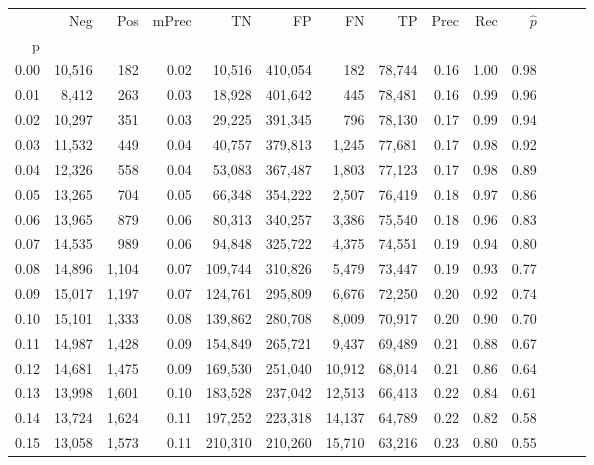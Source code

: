 \begin{tabular}{rrrrrrrrrrrrrr}
\toprule
{} &     Neg &    Pos & mPrec &       TN &       FP &      FN &      TP &  Prec &   Rec & $\hat{p}$ \\
p    &         &        &       &          &          &         &         &       &       &           \\
\midrule
0.00 &  10,516 &    182 &  0.02 &   10,516 &  410,054 &     182 &  78,744 &  0.16 &  1.00 &      0.98 \\
0.01 &   8,412 &    263 &  0.03 &   18,928 &  401,642 &     445 &  78,481 &  0.16 &  0.99 &      0.96 \\
0.02 &  10,297 &    351 &  0.03 &   29,225 &  391,345 &     796 &  78,130 &  0.17 &  0.99 &      0.94 \\
0.03 &  11,532 &    449 &  0.04 &   40,757 &  379,813 &   1,245 &  77,681 &  0.17 &  0.98 &      0.92 \\
0.04 &  12,326 &    558 &  0.04 &   53,083 &  367,487 &   1,803 &  77,123 &  0.17 &  0.98 &      0.89 \\
0.05 &  13,265 &    704 &  0.05 &   66,348 &  354,222 &   2,507 &  76,419 &  0.18 &  0.97 &      0.86 \\
0.06 &  13,965 &    879 &  0.06 &   80,313 &  340,257 &   3,386 &  75,540 &  0.18 &  0.96 &      0.83 \\
0.07 &  14,535 &    989 &  0.06 &   94,848 &  325,722 &   4,375 &  74,551 &  0.19 &  0.94 &      0.80 \\
0.08 &  14,896 &  1,104 &  0.07 &  109,744 &  310,826 &   5,479 &  73,447 &  0.19 &  0.93 &      0.77 \\
0.09 &  15,017 &  1,197 &  0.07 &  124,761 &  295,809 &   6,676 &  72,250 &  0.20 &  0.92 &      0.74 \\
0.10 &  15,101 &  1,333 &  0.08 &  139,862 &  280,708 &   8,009 &  70,917 &  0.20 &  0.90 &      0.70 \\
0.11 &  14,987 &  1,428 &  0.09 &  154,849 &  265,721 &   9,437 &  69,489 &  0.21 &  0.88 &      0.67 \\
0.12 &  14,681 &  1,475 &  0.09 &  169,530 &  251,040 &  10,912 &  68,014 &  0.21 &  0.86 &      0.64 \\
0.13 &  13,998 &  1,601 &  0.10 &  183,528 &  237,042 &  12,513 &  66,413 &  0.22 &  0.84 &      0.61 \\
0.14 &  13,724 &  1,624 &  0.11 &  197,252 &  223,318 &  14,137 &  64,789 &  0.22 &  0.82 &      0.58 \\
0.15 &  13,058 &  1,573 &  0.11 &  210,310 &  210,260 &  15,710 &  63,216 &  0.23 &  0.80 &      0.55 \\

\end{tabular}
